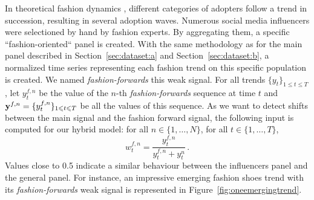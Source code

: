 \documentclass[review]{elsarticle}
\newcommand{\ts}{y}
\newcommand{\fullts}{{\bf \ts}}
\newcommand{\ws}{w}
\begin{document}
In theoretical fashion dynamics \cite{rogersdiffusion}, different categories of adopters follow a trend in succession, resulting in several adoption waves. %
Numerous social media influencers were selectioned by hand by fashion experts. By aggregating them, a specific ``fashion-oriented`` panel is created. With the same methodology as for the main panel described in Section~\ref{sec:dataset:a} and Section~\ref{sec:dataset:b}, a normalized time series representing each fashion trend on this specific population is created. We named \textit{fashion-forwards} this weak signal.  For all trends $\{y_t\}_{1\leqslant t\leqslant T}$, let $\ts_t^{f,n}$ be the value of the $n$-th \textit{fashion-forwards} sequence at time $t$ and  $\fullts^{f,n} = \{\ts_t^{f,n}\}_{1\leqslant t \leqslant T}$ be all the values of this sequence.
As we want to detect shifts between the main signal and the fashion forward signal, the following input is computed for our hybrid model:  for all $n \in \{1,\ldots,N\}$, for all $t \in \{1,\ldots,T\}$,
$$
\ws^{f,n}_{t} = \frac{\ts_t^{f,n}}{\ts_t^{f,n}+\ts_t^{n}}\,.
$$
Values close to 0.5 indicate a similar behaviour between the influencers panel and the general panel. For instance, an impressive emerging fashion shoes trend with its \textit{fashion-forwards} weak signal is represented in Figure~\ref{fig:oneemergingtrend}. 


%
\end{document}
